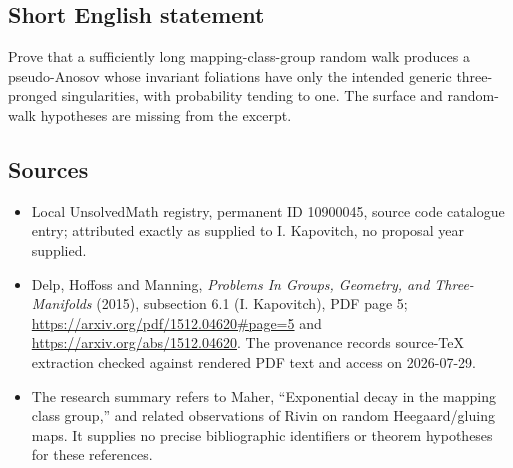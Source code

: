 \documentclass[11pt]{article}
\begin{document}
\subsection{Short English statement}
Prove that a sufficiently long mapping-class-group random walk produces a pseudo-Anosov whose invariant foliations have only the intended generic three-pronged singularities, with probability tending to one. The surface and random-walk hypotheses are missing from the excerpt.
\subsection{Sources}
\begin{itemize}
\item Local UnsolvedMath registry, permanent ID 10900045, source code catalogue entry; attributed exactly as supplied to I. Kapovitch, no proposal year supplied.
\item Delp, Hoffoss and Manning, \emph{Problems In Groups, Geometry, and Three-Manifolds} (2015), subsection 6.1 (I. Kapovitch), PDF page 5; \url{https://arxiv.org/pdf/1512.04620#page=5} and \url{https://arxiv.org/abs/1512.04620}. The provenance records source-TeX extraction checked against rendered PDF text and access on 2026-07-29.
\item The research summary refers to Maher, ``Exponential decay in the mapping class group,'' and related observations of Rivin on random Heegaard/gluing maps. It supplies no precise bibliographic identifiers or theorem hypotheses for these references.
\end{itemize}
\end{document}
